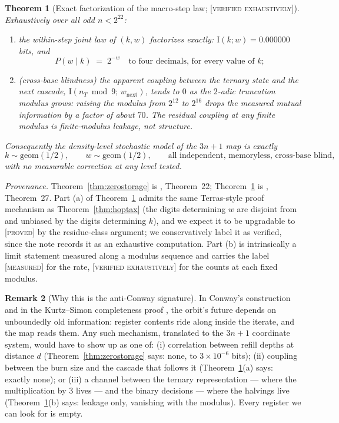 \documentclass[11pt]{article}
\newtheorem{theorem}{Theorem}[section]
\theoremstyle{definition}
\newtheorem{remark}[theorem]{Remark}
\newcommand{\PROVED}{\textup{[\textsc{proved}]}}
\newcommand{\VERIFIED}{\textup{[\textsc{verified exhaustively}]}}
\newcommand{\MEASURED}{\textup{[\textsc{measured}]}}
\newcommand{\Info}{\mathrm{I}}
\begin{document}
\begin{theorem}[Exact factorization of the macro-step law; \VERIFIED]\label{thm:factorization}
Exhaustively over all odd $n < 2^{22}$:
\begin{enumerate}[label=(\alph*)]
\item the within-step joint law of $(k, w)$ factorizes exactly:
$\Info(k; w) = 0.000000$ bits, and
\[
P(w \mid k) \;=\; 2^{-w} \quad \text{to four decimals, for every value of } k;
\]
\item \textup{(cross-base blindness)} the apparent coupling between the ternary state
and the next cascade, $\Info(n_T \bmod 9;\, w_{\mathrm{next}})$, tends to $0$ as the
$2$-adic truncation modulus grows: raising the modulus from $2^{12}$ to $2^{16}$
drops the measured mutual information by a factor of about $70$. The residual coupling
at any finite modulus is finite-modulus leakage, not structure.
\end{enumerate}
Consequently the density-level stochastic model of the $3n+1$ map is exactly
\[
k \sim \mathrm{geom}(1/2), \qquad w \sim \mathrm{geom}(1/2), \qquad
\text{all independent, memoryless, cross-base blind,}
\]
with no measurable correction at any level tested.
\end{theorem}

\emph{Provenance.} Theorem~\ref{thm:zerostorage} is \cite{Note2026}, Theorem~22;
Theorem~\ref{thm:factorization} is \cite{Note2026}, Theorem~27. Part (a) of
Theorem~\ref{thm:factorization} admits the same Terras-style proof mechanism as
Theorem~\ref{thm:hoptax} (the digits determining $w$ are disjoint from and unbiased by
the digits determining $k$), and we expect it to be upgradable to \PROVED{} by the
residue-class argument; we conservatively label it as verified, since the note records
it as an exhaustive computation. Part (b) is intrinsically a limit statement measured
along a modulus sequence and carries the label \MEASURED{} for the rate, \VERIFIED{}
for the counts at each fixed modulus.

\begin{remark}[Why this is the anti-Conway signature]
In Conway's construction \cite{Conway1972} and in the Kurtz--Simon completeness proof
\cite{KurtzSimon2007}, the orbit's future depends on unboundedly old information:
register contents ride along inside the iterate, and the map reads them. Any such
mechanism, translated to the $3n+1$ coordinate system, would have to show up as one of:
(i) correlation between refill depths at distance $d$ (Theorem~\ref{thm:zerostorage}
says: none, to $3 \times 10^{-6}$ bits); (ii) coupling between the burn size and the
cascade that follows it (Theorem~\ref{thm:factorization}(a) says: exactly none); or
(iii) a channel between the ternary representation --- where the multiplication by $3$
lives --- and the binary decisions --- where the halvings live
(Theorem~\ref{thm:factorization}(b) says: leakage only, vanishing with the modulus).
Every register we can look for is empty.
\end{remark}
\end{document}
